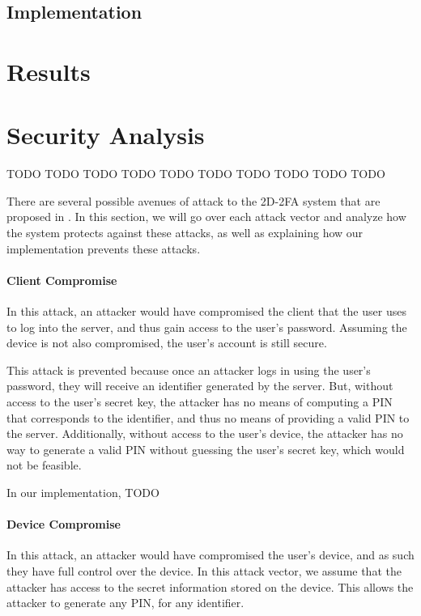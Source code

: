 \documentclass[11pt]{article} %
\begin{document}
\subsection{Implementation}




\section{Results}



\section{Security Analysis}

TODO TODO TODO TODO TODO TODO TODO TODO TODO TODO

There are several possible avenues of attack to the 2D-2FA system that
are proposed in \cite{shirvanian2d2fa}. In this section, we will go over
each attack vector and analyze how the system protects against these
attacks, as well as explaining how our implementation prevents these
attacks. 

\paragraph{Client Compromise}
In this attack, an attacker would have compromised the client that the
user uses to log into the server, and thus gain access to the user's
password. Assuming the device is not also compromised, the user's
account is still secure. 

This attack is prevented because once an attacker logs in using the
user's password, they will receive an identifier generated by the
server. But, without access to the user's secret key, the attacker has
no means of computing a PIN that corresponds to the identifier, and
thus no means of providing a valid PIN to the server. Additionally,
without access to the user's device, the attacker has no way to generate
a valid PIN without guessing the user's secret key, which would not be
feasible. 

In our implementation, TODO

\paragraph{Device Compromise}
In this attack, an attacker would have compromised the user's device,
and as such they have full control over the device. In this attack
vector, we assume that the attacker has access to the secret information
stored on the device. This allows the attacker to generate any PIN, for
any identifier.
\end{document}
